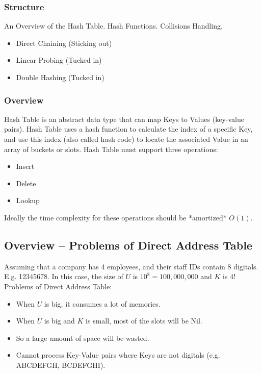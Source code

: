 
\usetikzlibrary{arrows, positioning}
\subsubsection{Structure}
An Overview of the Hash Table.
Hash Functions.
Collisions Handling.
\begin{itemize}
    \item Direct Chaining (Sticking out)
    \item Linear Probing (Tucked in)
    \item Double Hashing (Tucked in)
\end{itemize}

\subsubsection{Overview}
Hash Table is an abstract data type that can map Keys to Values (key-value pairs).
Hash Table uses a hash function to calculate the index of a specific Key, and use this index (also called hash code) to locate the associated Value in an array of buckets or slots.
Hash Table must support three operations:
\begin{itemize}
    \item Insert
    \item Delete
    \item Lookup
\end{itemize}
Ideally the time complexity for these operations should be *amortized* $O(1)$.

\subsection*{Overview – Problems of Direct Address Table}
Assuming that a company has 4 employees, and their staff IDs contain 8 digitals.
E.g. 12345678.
In this case, the size of $U$ is $10^8 = 100,000,000$ and $K$ is 4!
Problems of Direct Address Table:
\begin{itemize}
    \item When $U$ is big, it consumes a lot of memories.
    \item When $U$ is big and $K$ is small, most of the slots will be Nil.
    \item So a large amount of space will be wasted.
    \item Cannot process Key-Value pairs where Keys are not digitals (e.g. ABCDEFGH, BCDEFGHI).
\end{itemize}

